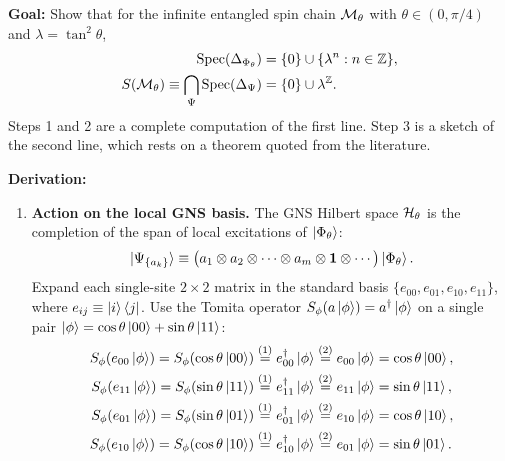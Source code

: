 \begin{keyresult}
\textbf{Goal:} Show that for the infinite entangled spin chain $\mathcal{M}_\theta$ with $\theta \in (0, \pi/4)$ and
$\lambda = \tan^2\theta$,
\[
\begin{aligned}
\mathrm{Spec}(\Delta_{\Phi_\theta}) &= \{0\} \cup \{\lambda^n : n \in \mathbb{Z}\}, \\
S(\mathcal{M}_\theta) \equiv \bigcap_{\Psi} \mathrm{Spec}(\Delta_\Psi) &= \{0\} \cup \lambda^{\mathbb{Z}} .
\end{aligned}
\]
Steps 1 and 2 are a complete computation of the first line. Step 3 is a sketch of the second line, which rests
on a theorem quoted from the literature.

\textbf{Derivation:}
\begin{enumerate}[leftmargin=*]
\item \textbf{Action on the local GNS basis.}
The GNS Hilbert space $\mathcal{H}_\theta$ is the completion of the span of local excitations of $\ket{\Phi_\theta}$:
\[
\ket{\Psi_{\{a_k\}}} \equiv \big(a_1 \otimes a_2 \otimes \cdots \otimes a_m \otimes \mathbf{1} \otimes \cdots\big)
\ket{\Phi_\theta} .
\]
Expand each single-site $2\times2$ matrix in the standard basis $\{e_{00}, e_{01}, e_{10}, e_{11}\}$, where
$e_{ij} \equiv \ket{i}\bra{j}$. Use the Tomita operator $S_\phi (a\ket\phi) = a^\dagger\ket\phi$ on a single
pair $\ket\phi = \cos\theta\ket{00} + \sin\theta\ket{11}$:
\begin{align}
S_\phi (e_{00}\ket\phi) = S_\phi (\cos\theta\ket{00}) &\overset{(1)}{=} e_{00}^\dagger\ket\phi \overset{(2)}{=}
e_{00}\ket\phi = \cos\theta\ket{00} , \notag\\
S_\phi (e_{11}\ket\phi) = S_\phi (\sin\theta\ket{11}) &\overset{(1)}{=} e_{11}^\dagger\ket\phi \overset{(2)}{=}
e_{11}\ket\phi = \sin\theta\ket{11} , \notag\\
S_\phi (e_{01}\ket\phi) = S_\phi (\sin\theta\ket{01}) &\overset{(1)}{=} e_{01}^\dagger\ket\phi \overset{(2)}{=}
e_{10}\ket\phi = \cos\theta\ket{10} , \notag\\
S_\phi (e_{10}\ket\phi) = S_\phi (\cos\theta\ket{10}) &\overset{(1)}{=} e_{10}^\dagger\ket\phi \overset{(2)}{=}
e_{01}\ket\phi = \sin\theta\ket{01} . \notag
\end{align}
\quad
{}


\end{enumerate}
\end{keyresult}
